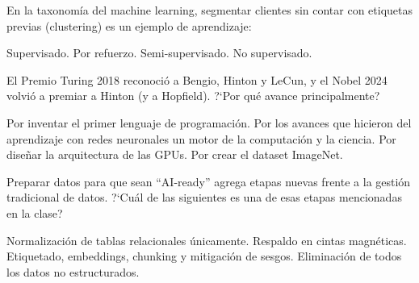 \documentclass[12pt,addpoints]{exam}
\begin{document}
\begin{questions}
\question[1] En la taxonom\'ia del machine learning, segmentar clientes sin
contar con etiquetas previas (clustering) es un ejemplo de aprendizaje:
\begin{choices}
  \choice Supervisado.
  \choice Por refuerzo.
  \choice Semi-supervisado.
  \CorrectChoice No supervisado.
\end{choices}

\question[1] El Premio Turing 2018 reconoci\'o a Bengio, Hinton y LeCun, y el
Nobel 2024 volvi\'o a premiar a Hinton (y a Hopfield). ?`Por qu\'e avance
principalmente?
\begin{choices}
  \choice Por inventar el primer lenguaje de programaci\'on.
  \CorrectChoice Por los avances que hicieron del aprendizaje con redes
    neuronales un motor de la computaci\'on y la ciencia.
  \choice Por dise\~nar la arquitectura de las GPUs.
  \choice Por crear el dataset ImageNet.
\end{choices}

\question[1] Preparar datos para que sean ``AI-ready'' agrega etapas nuevas
frente a la gesti\'on tradicional de datos. ?`Cu\'al de las siguientes es una de
esas etapas mencionadas en la clase?
\begin{choices}
  \choice Normalizaci\'on de tablas relacionales \'unicamente.
  \choice Respaldo en cintas magn\'eticas.
  \CorrectChoice Etiquetado, embeddings, chunking y mitigaci\'on de sesgos.
  \choice Eliminaci\'on de todos los datos no estructurados.
\end{choices}

\end{questions}
\end{document}
